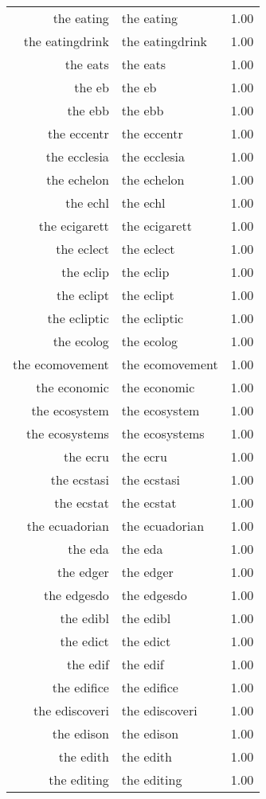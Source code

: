 \begin{table}[ht]
\begin{tabular}{rlr}
  the eating & the eating & 1.00 \\ 
  the eatingdrink & the eatingdrink & 1.00 \\ 
  the eats & the eats & 1.00 \\ 
  the eb & the eb & 1.00 \\ 
  the ebb & the ebb & 1.00 \\ 
  the eccentr & the eccentr & 1.00 \\ 
  the ecclesia & the ecclesia & 1.00 \\ 
  the echelon & the echelon & 1.00 \\ 
  the echl & the echl & 1.00 \\ 
  the ecigarett & the ecigarett & 1.00 \\ 
  the eclect & the eclect & 1.00 \\ 
  the eclip & the eclip & 1.00 \\ 
  the eclipt & the eclipt & 1.00 \\ 
  the ecliptic & the ecliptic & 1.00 \\ 
  the ecolog & the ecolog & 1.00 \\ 
  the ecomovement & the ecomovement & 1.00 \\ 
  the economic & the economic & 1.00 \\ 
  the ecosystem & the ecosystem & 1.00 \\ 
  the ecosystems & the ecosystems & 1.00 \\ 
  the ecru & the ecru & 1.00 \\ 
  the ecstasi & the ecstasi & 1.00 \\ 
  the ecstat & the ecstat & 1.00 \\ 
  the ecuadorian & the ecuadorian & 1.00 \\ 
  the eda & the eda & 1.00 \\ 
  the edger & the edger & 1.00 \\ 
  the edgesdo & the edgesdo & 1.00 \\ 
  the edibl & the edibl & 1.00 \\ 
  the edict & the edict & 1.00 \\ 
  the edif & the edif & 1.00 \\ 
  the edifice & the edifice & 1.00 \\ 
  the ediscoveri & the ediscoveri & 1.00 \\ 
  the edison & the edison & 1.00 \\ 
  the edith & the edith & 1.00 \\ 
  the editing & the editing & 1.00 \\ 

\end{tabular}
\end{table}
